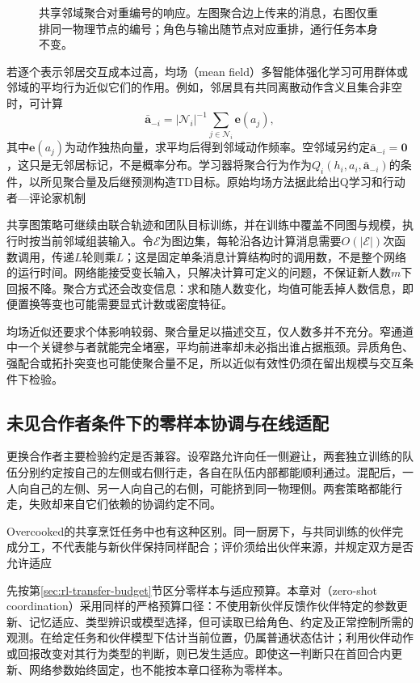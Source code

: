 \begin{figure}[htbp]
 \centering
 
 \caption{共享邻域聚合对重编号的响应。左图聚合边上传来的消息，右图仅重排同一物理节点的编号；角色与输出随节点对应重排，通行任务本身不变。}
 \label{fig:rl-multi-agent-graph}
\end{figure}

若逐个表示邻居交互成本过高，均场（mean field）多智能体强化学习可用群体或邻域的平均行为近似它们的作用。例如，邻居具有共同离散动作含义且集合非空时，可计算
\[
 \bar{\bm a}_{-i}
 =|\mathcal N_i|^{-1}\sum_{j\in\mathcal N_i}\bm e(a_j),
\]
其中$\bm e(a_j)$为动作独热向量，求平均后得到邻域动作频率。空邻域另约定$\bar{\bm a}_{-i}=\bm0$，这只是无邻居标记，不是概率分布。学习器将聚合行为作为$Q_i(h_i,a_i,\bar{\bm a}_{-i})$的条件，以所见聚合量及后继预测构造TD目标。原始均场方法据此给出Q学习和行动者—评论家机制

共享图策略可继续由联合轨迹和团队目标训练，并在训练中覆盖不同图与规模，执行时按当前邻域组装输入。令$\mathcal E$为图边集，每轮沿各边计算消息需要$O(|\mathcal E|)$次函数调用，传递$L$轮则乘$L$；这是固定单条消息计算结构时的调用数，不是整个网络的运行时间。网络能接受变长输入，只解决计算可定义的问题，不保证新人数$m$下回报不降。聚合方式还会改变信息：求和随人数变化，均值可能丢掉人数信息，即便置换等变也可能需要显式计数或密度特征。

均场近似还要求个体影响较弱、聚合量足以描述交互，仅人数多并不充分。窄通道中一个关键参与者就能完全堵塞，平均前进率却未必指出谁占据瓶颈。异质角色、强配合或拓扑突变也可能使聚合量不足，所以近似有效性仍须在留出规模与交互条件下检验。

\subsection{未见合作者条件下的零样本协调与在线适配}
\label{sec:rl-multi-agent-new-partners}

更换合作者主要检验约定是否兼容。设窄路允许向任一侧避让，两套独立训练的队伍分别约定按自己的左侧或右侧行走，各自在队伍内部都能顺利通过。混配后，一人向自己的左侧、另一人向自己的右侧，可能挤到同一物理侧。两套策略都能行走，失败却来自它们依赖的协调约定不同。

Overcooked的共享烹饪任务中也有这种区别。同一厨房下，与共同训练的伙伴完成分工，不代表能与新伙伴保持同样配合；评价须给出伙伴来源，并规定双方是否允许适应

先按第\ref{sec:rl-transfer-budget}节区分零样本与适应预算。本章对（zero-shot coordination）采用同样的严格预算口径：不使用新伙伴反馈作伙伴特定的参数更新、记忆适应、类型辨识或模型选择，但可读取已给角色、约定及正常控制所需的观测。在给定任务和伙伴模型下估计当前位置，仍属普通状态估计；利用伙伴动作或回报改变对其行为类型的判断，则已发生适应。即使这一判断只在首回合内更新、网络参数始终固定，也不能按本章口径称为零样本。

